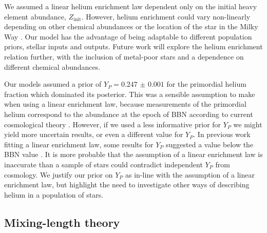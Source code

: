 \documentclass[a4paper,fleqn,usenatbib]{mnras}
\begin{document}

We assumed a linear helium enrichment law dependent only on the initial heavy element abundance, $Z_\mathrm{init}$. However, helium enrichment could vary non-linearly depending on other chemical abundances \citep{West.Heger2013} or the location of the star in the Milky Way \citep{Frebel2010}. Our model has the advantage of being adaptable to different population priors, stellar inputs and outputs. Future work will explore the helium enrichment relation further, with the inclusion of metal-poor stars and a dependence on different chemical abundances.

Our models assumed a prior of $Y_P = \num{0.247(1)}$ for the primordial helium fraction which dominated its posterior. This was a sensible assumption to make when using a linear enrichment law, because measurements of the primordial helium correspond to the abundance at the epoch of BBN according to current cosmological theory \citep{Cyburt.Fields.ea2016}. However, if we used a less informative prior for $Y_P$ we might yield more uncertain results, or even a different value for $Y_P$. In previous work fitting a linear enrichment law, some results for $Y_P$ suggested a value below the BBN value \citep{Casagrande.Flynn.ea2007, SilvaAguirre.Lund.ea2017}. It is more probable that the assumption of a linear enrichment law is inaccurate than a sample of stars could contradict independent $Y_P$ from cosmology. We justify our prior on $Y_P$ as in-line with the assumption of a linear enrichment law, but highlight the need to investigate other ways of describing helium in a population of stars.

\subsection{Mixing-length theory}\label{sec:mlt}
\end{document}

